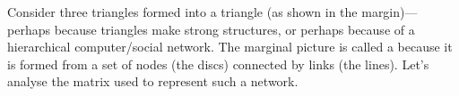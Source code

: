\begin{example} \label{eg:sier2eig}
Consider three triangles formed into a triangle (as shown in the margin)---perhaps because triangles make strong structures, or perhaps because of a hierarchical computer\slash social network.
%
The marginal picture is called a  because it is formed from a set of nodes (the discs) connected by links (the lines).
Let's analyse the matrix used to represent such a network.
 

\end{example}
